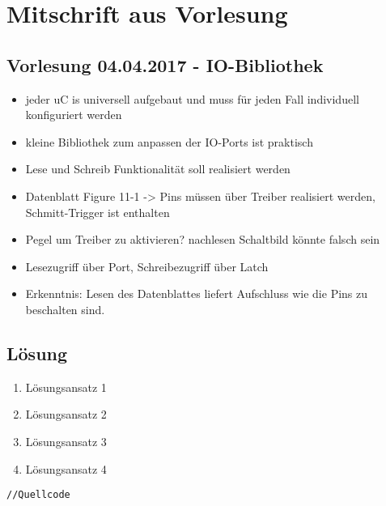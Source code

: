 \section{Mitschrift aus Vorlesung}
\subsection{Vorlesung 04.04.2017 - IO-Bibliothek}

\begin{itemize}%
		\item jeder uC is universell aufgebaut und muss für jeden Fall individuell konfiguriert werden
		\item kleine Bibliothek zum anpassen der IO-Ports ist praktisch
		\item Lese und Schreib Funktionalität soll realisiert werden
		\item Datenblatt Figure 11-1 -> Pins müssen über Treiber realisiert werden, Schmitt-Trigger ist enthalten
		\item Pegel um Treiber zu aktivieren? nachlesen Schaltbild könnte falsch sein
		\item Lesezugriff über Port, Schreibezugriff über Latch
		\item Erkenntnis: Lesen des Datenblattes liefert Aufschluss wie die Pins zu beschalten sind. 
		
\end{itemize}

\subsection{Lösung}
\begin{enumerate}
		\item Lösungsansatz 1
		\item Lösungsansatz 2
		\item Lösungsansatz 3
		\item Lösungsansatz 4
\end{enumerate}


\begin{lstlisting}[frame=htrbl, caption={Listening Bezeichnung}, label={lst:Referenzname}]
//Quellcode
\end{lstlisting}

